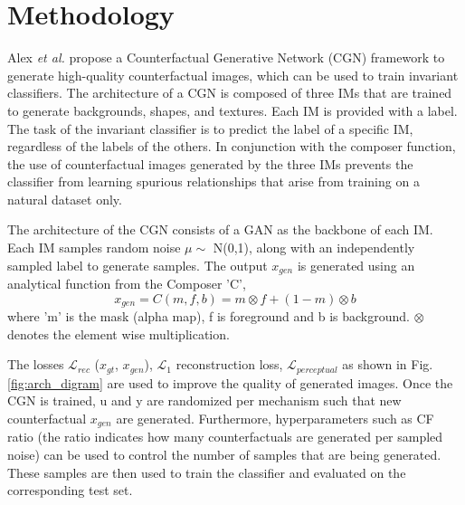 \section{Methodology}
Alex \textit{et al.} \cite{sauer2021counterfactual} propose a Counterfactual Generative Network (CGN) framework to generate high-quality counterfactual images, which can be used to train invariant classifiers. The architecture of a CGN is composed of three IMs that are trained to generate backgrounds, shapes, and textures. Each IM is provided with a label. The task of the invariant classifier is to predict the label of a specific IM, regardless of the labels of the others. In conjunction with the composer function, the use of counterfactual images generated by the three IMs prevents the classifier from learning spurious relationships that arise from training on a natural dataset only.




The architecture of the CGN consists of a GAN as the backbone of each IM. 
Each IM samples random noise $\mu \sim$ N(0,1), along with an independently sampled label to generate samples. The output $x_{gen}$ is generated using an analytical function from the Composer 
'C',
$$x_{gen} = C(m,f,b) = m \otimes f + (1-m) \otimes b$$ 
where 'm' is the mask (alpha map), f is foreground and b is background. $\otimes$  denotes the element wise multiplication. 

The losses $\mathcal{L}_{rec}$ ($x_{gt}$, $x_{gen}$), $\mathcal{L}_{1}$ reconstruction loss, $\mathcal{L}_{perceptual}$ as shown in Fig. \ref{fig:arch_digram} are used to improve the quality of generated images. Once the CGN is trained, u and y are randomized per mechanism such that new counterfactual $x_{gen}$ are generated. Furthermore, hyperparameters such as CF ratio (the ratio indicates how many counterfactuals are generated per sampled noise) can be used to control the number of samples that are being generated. These samples are then used to train the classifier and evaluated on the corresponding test set. 

